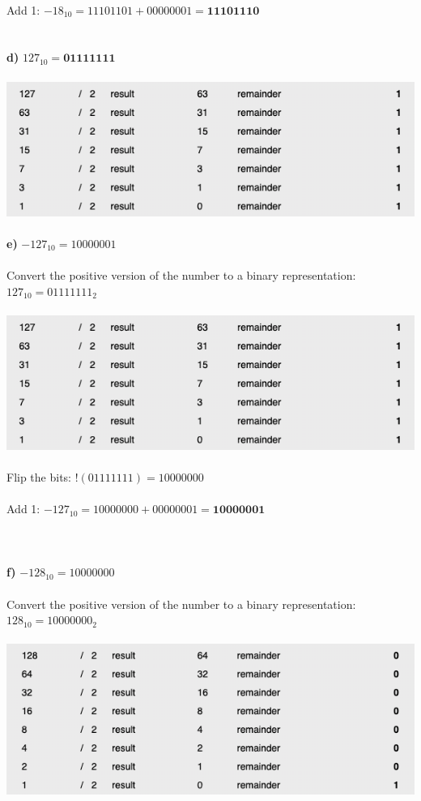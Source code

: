 \documentclass[a4paper]{article}
\begin{document}
\\
Add 1: $-18_{10} = 11101101 + 00000001 = \mathbf{11101110}$\\
\\
\\
\textbf{d)} $127_{10} = \mathbf{01111111}$\\
\\
\includegraphics[scale=0.6]{127.png}
\\
\\
\textbf{e)} $-127_{10} = 10000001$\\
\\
Convert the positive version of the number to a binary representation: $127_{10} = 01111111_2$\\
\\
\includegraphics[scale=0.6]{127.png}
\\
\\
Flip the bits: $!(01111111) = 10000000$\\
\\
Add 1: $-127_{10} = 10000000 + 00000001 = \mathbf{10000001}$\\
\\
\pagebreak
\\
\\
\textbf{f)} $-128_{10} = 10000000$\\
\\
Convert the positive version of the number to a binary representation: $128_{10} = 10000000_2$\\
\\
\includegraphics[scale=0.6]{128.png}
\end{document}
